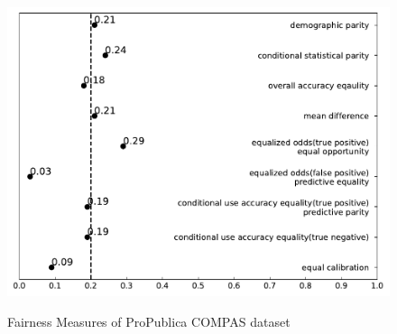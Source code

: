 \documentclass[conference]{IEEEtran}
\begin{document}
\begin{figure}[h]
\begin{minipage}[b]{0.48\linewidth}
        \includegraphics[width=\linewidth]{Non-Native-American}
        \label{fig:2}
    \end{minipage}
    \caption{Fairness Measures of ProPublica COMPAS dataset}
    \label{fig:compas}
\end{figure}



\end{document}
